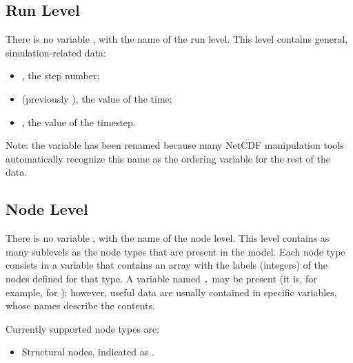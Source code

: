 \subsection{Run Level}
There is no variable , with the name of the run level.
This level contains general, simulation-related data:
\begin{itemize}
\item {}, the step number;
\item {} (previously ), the value of the time;
\item {}, the value of the timestep.
\end{itemize}
Note: the  variable has been renamed 
because many NetCDF manipulation tools automatically recognize
this name as the ordering variable for the rest of the data.



\subsection{Node Level}
There is no variable , with the name of the node level.
This level contains as many sublevels as the node types
that are present in the model.
Each node type consists in a variable that contains an array
with the labels (integers) of the nodes defined for that type.
A variable named \texttt{.} may be present
(it is, for example, for ); however, useful data are usually
contained in specific variables, whose names describe the contents.

Currently supported node types are:
\begin{itemize}
\item Structural nodes, indicated as .
\end{itemize}



